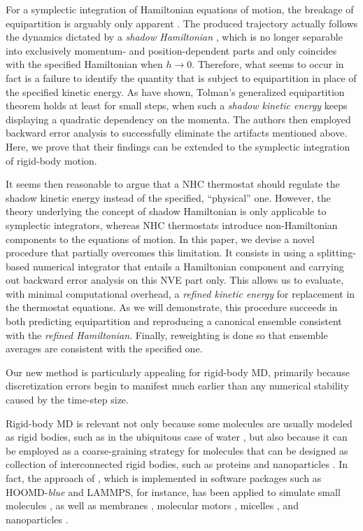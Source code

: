 \documentclass[
journal=jctcce,
layout=twocolumn
]{achemso}
\newcommand{\timestep}{h}
\begin{document}
For a symplectic integration of Hamiltonian equations of motion, the breakage of equipartition is arguably only apparent \cite{Eastwood_2010}.
The produced trajectory actually follows the dynamics dictated by a \textit{shadow Hamiltonian} \cite{Tuckerman_2010}, which is no longer separable into exclusively momentum- and position-dependent parts and only coincides with the specified Hamiltonian when $\timestep \to 0$.
Therefore, what seems to occur in fact is a failure to identify the quantity that is subject to equipartition in place of the specified kinetic energy.
As \citeauthor{Eastwood_2010} \cite{Eastwood_2010} have shown, Tolman's generalized equipartition theorem \cite{Tolman_1918, Uline_2008} holds at least for small steps, when such a \textit{shadow kinetic energy} keeps displaying a quadratic dependency on the momenta.
The authors then employed backward error analysis to successfully eliminate the artifacts mentioned above.
Here, we prove that their findings can be extended to the symplectic integration of rigid-body motion.

It seems then reasonable to argue that a NHC thermostat should regulate the shadow kinetic energy instead of the specified, ``physical'' one.
However, the theory underlying the concept of shadow Hamiltonian is only applicable to symplectic integrators, whereas NHC thermostats introduce non-Hamiltonian components to the equations of motion.
In this paper, we devise a novel procedure that partially overcomes this limitation.
It consists in using a splitting-based numerical integrator that entails a Hamiltonian component and carrying out backward error analysis on this NVE part only.
This allows us to evaluate, with minimal computational overhead, a \textit{refined kinetic energy} for replacement in the thermostat equations.
As we will demonstrate, this procedure succeeds in both predicting equipartition and reproducing a canonical ensemble consistent with the \textit{refined Hamiltonian}.
Finally, reweighting is done so that ensemble averages are consistent with the specified one.

Our new method is particularly appealing for rigid-body MD, primarily because discretization errors begin to manifest much earlier than any numerical stability caused by the time-step size. 



Rigid-body MD is relevant not only because some molecules are usually modeled as rigid bodies, such as in the ubiquitous case of water \cite{Jorgensen_1983}, but also because it can be employed as a coarse-graining strategy for molecules that can be designed as collection of interconnected rigid bodies, such as proteins and nanoparticles \cite{Knorowski_2012, Patra_2013}.
In fact, the approach of \citeauthor{Kamberaj_2005} \cite{Kamberaj_2005}, which is implemented in software packages such as HOOMD-\textit{blue}\cite{Anderson_2008} and LAMMPS\cite{Plimpton_1995}, for instance, has been applied to simulate small molecules \cite{Geiger_2013, Aimoli_2014, Aimoli_2014_2}, as well as membranes \cite{Bucior_2012}, molecular motors \cite{Akimov_2012}, micelles \cite{Yan_2008}, and nanoparticles \cite{Patra_2014}.
\end{document}
